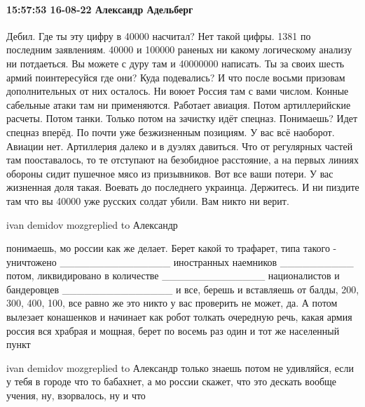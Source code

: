 
 
 
 
 

\paragraph{15:57:53 16-08-22 Александр Адельберг}

Дебил. Где ты эту цифру в 40000 насчитал? Нет такой цифры. 1381 по последним заявлениям. 40000 и 100000 раненых ни какому логическому анализу ни потдаеться. Вы можете с дуру там и 40000000 написать. Ты за своих шесть армий поинтересуйся где они? Куда подевались? И что после восьми призовам дополнительных от них осталось.
Ни воюет Россия там с вами числом. Конные сабельные атаки там ни применяются. Работает авиация. Потом артиллерийские расчеты. Потом танки. Только потом на зачистку идёт спецназ. Понимаешь? Идет спецназ вперёд.
По почти уже безжизненным позициям.
У вас всё наоборот.
Авиации нет. Артиллерия далеко и в дуэлях давиться. Что от регулярных частей там пооставалось, то те отступают на безобидное расстояние, а на первых линиях обороны сидит пушечное мясо из призывников. Вот все ваши потери. У вас жизненная доля такая. Воевать до последнего украинца. Держитесь. И ни пиздите там что вы 40000 уже русских солдат убили. Вам никто ни верит.

ivan demidov mozgreplied to Александр

понимаешь, мо россии как же делает. Берет какой то трафарет, типа такого - уничтожено _______________ иностранных наемников __________ потом, ликвидировано в количестве ______________ националистов и бандеровцев _______________ и все, берешь и вставляешь от балды, 200, 300, 400, 100, все равно же это никто у вас проверить не может, да. А потом вылезает конашенков и начинает как робот толкать очередную речь, какая армия россия вся храбрая и мощная, берет по восемь раз один и тот же населенный пункт

ivan demidov mozgreplied to Александр
только знаешь потом не удивляйся, если у тебя в городе что то бабахнет, а мо россии скажет, что это дескать вообще учения, ну, взорвалось, ну и что
